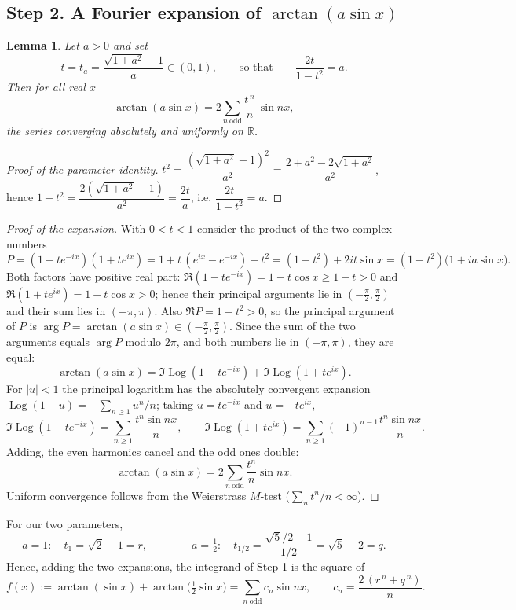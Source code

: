 \documentclass[11pt]{article}
\newtheorem{lemma}{Lemma}
\theoremstyle{remark}
\begin{document}
\subsection*{Step 2. A Fourier expansion of $\arctan(a\sin x)$}

\begin{lemma}
Let $a>0$ and set
\[
t=t_a=\frac{\sqrt{1+a^{2}}-1}{a}\in(0,1),\qquad\text{so that}\qquad \frac{2t}{1-t^{2}}=a .
\]
Then for all real $x$
\[
\arctan(a\sin x)=2\sum_{n\ \mathrm{odd}}\frac{t^{\,n}}{n}\,\sin nx ,
\]
the series converging absolutely and uniformly on $\mathbb R$.
\end{lemma}

\begin{proof}[Proof of the parameter identity]
$t^2=\dfrac{(\sqrt{1+a^2}-1)^2}{a^2}=\dfrac{2+a^2-2\sqrt{1+a^2}}{a^2}$, hence
$1-t^2=\dfrac{2(\sqrt{1+a^2}-1)}{a^2}=\dfrac{2t}{a}$, i.e. $\dfrac{2t}{1-t^2}=a$.
\end{proof}

\begin{proof}[Proof of the expansion]
With $0<t<1$ consider the product of the two complex numbers
\[
P=(1-te^{-ix})(1+te^{ix})=1+t\,(e^{ix}-e^{-ix})-t^{2}=(1-t^{2})+2it\sin x=(1-t^{2})\bigl(1+ia\sin x\bigr).
\]
Both factors have positive real part: $\Re(1-te^{-ix})=1-t\cos x\ge 1-t>0$ and $\Re(1+te^{ix})=1+t\cos x>0$; hence their principal arguments lie in $(-\tfrac\pi2,\tfrac\pi2)$ and their sum lies in $(-\pi,\pi)$. Also $\Re P=1-t^{2}>0$, so the principal argument of $P$ is $\arg P=\arctan(a\sin x)\in(-\tfrac\pi2,\tfrac\pi2)$. Since the sum of the two arguments equals $\arg P$ modulo $2\pi$, and both numbers lie in $(-\pi,\pi)$, they are equal:
\[
\arctan(a\sin x)=\Im\operatorname{Log}(1-te^{-ix})+\Im\operatorname{Log}(1+te^{ix}).
\]
For $|u|<1$ the principal logarithm has the absolutely convergent expansion $\operatorname{Log}(1-u)=-\sum_{n\ge1}u^{n}/n$; taking $u=te^{-ix}$ and $u=-te^{ix}$,
\[
\Im\operatorname{Log}(1-te^{-ix})=\sum_{n\ge1}\frac{t^{n}\sin nx}{n},\qquad
\Im\operatorname{Log}(1+te^{ix})=\sum_{n\ge1}(-1)^{n-1}\frac{t^{n}\sin nx}{n}.
\]
Adding, the even harmonics cancel and the odd ones double:
\[
\arctan(a\sin x)=2\sum_{n\ \mathrm{odd}}\frac{t^{n}}{n}\sin nx .
\]
Uniform convergence follows from the Weierstrass $M$-test ($\sum_n t^n/n<\infty$).
\end{proof}

For our two parameters,
\[
a=1:\quad t_1=\sqrt2-1=r,\qquad\qquad a=\tfrac12:\quad t_{1/2}=\frac{\sqrt{5}/2-1}{1/2}=\sqrt5-2=q .
\]
Hence, adding the two expansions, the integrand of Step 1 is the square of
\[
f(x):=\arctan(\sin x)+\arctan\bigl(\tfrac12\sin x\bigr)=\sum_{n\ \mathrm{odd}}c_n\sin nx,\qquad c_n=\frac{2\,(r^{\,n}+q^{\,n})}{n}.
\]
\end{document}
